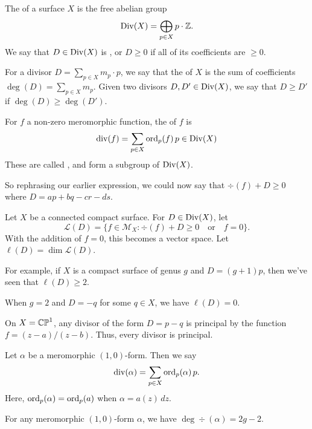 \documentclass{lkx_paper}
\begin{document}
\begin{definition}
	The  of a surface $X$ is the free abelian group
	\[
		\mathrm{Div}(X) = \bigoplus_{p\in X}p\cdot \mathbb{Z}.
	\]
	We say that $D\in \mathrm{Div}(X)$ is , or $D\geq 0$ if all of its coefficients are $\geq 0$.
\end{definition}

\begin{definition}
	For a divisor $D=\sum_{p\in X} m_p\cdot p$, we say that the  of $X$ is the sum of coefficients $\deg(D)=\sum_{p\in X} m_p$. Given two divisors $D,D'\in \mathrm{Div}(X)$, we say that $D\geq D'$ if $\deg(D)\geq \deg(D')$.
\end{definition}

\begin{definition}
	For $f$ a non-zero meromorphic function, the  of $f$ is
	\[
		\mathrm{div}(f) = \sum_{p\in X}\mathrm{ord}_p(f)\,p\in \mathrm{Div}(X)
	\]
	These are called , and form a subgroup of $\mathrm{Div}(X)$.
\end{definition}
So rephrasing our earlier expression, we could now say that $\div(f)+D\geq 0$ where $D = ap + bq - cr - ds$.
\begin{definition}
	Let $X$ be a connected compact surface. For $D\in \mathrm{Div}(X)$, let
	\[
		\mathcal{L}(D) = \{ f\in \mathcal{M}_X : \div(f) + D \geq 0\quad\textrm{or}\quad f = 0\}.
	\]
	With the addition of $f=0$, this becomes a vector space. Let $\ell(D)=\dim \mathcal{L}(D)$.
\end{definition}

\begin{example}
	For example, if $X$ is a compact surface of genus $g$ and $D = (g+1)p$, then we've seen that $\ell(D)\geq 2$.
\end{example}

\begin{example}
	When $g=2$ and $D=-q$ for some $q\in X$, we have $\ell(D)=0$.
\end{example}

\begin{example}
	On $X=\mathbb{CP}^1$, any divisor of the form $D = p-q$ is principal by the function $f=(z-a)/(z-b)$. Thus, every divisor is principal.
\end{example}

\begin{definition}
	Let $\alpha$ be a meromorphic $(1,0)$-form. Then we say
	\[
		\mathrm{div}(\alpha)= \sum_{p\in X} \mathrm{ord}_p(\alpha)\,p.
	\]
	Here, $\mathrm{ord}_p(\alpha) = \mathrm{ord}_p(a)$ when $\alpha = a(z)\,dz$.
\end{definition}
\begin{lemma}
	For any meromorphic $(1,0)$-form $\alpha$, we have $\deg\div(\alpha) = 2g-2$.
\end{lemma}
\end{document}
